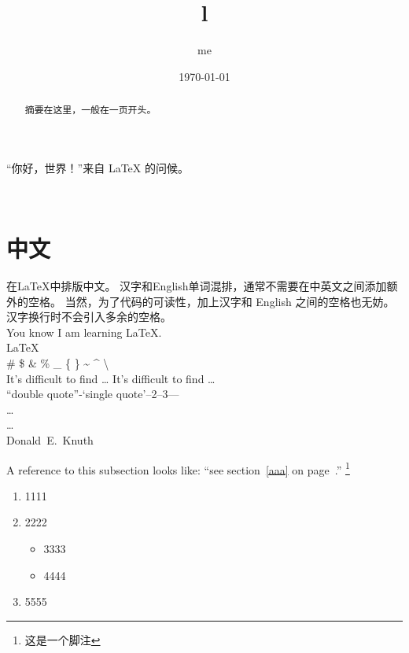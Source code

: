 \documentclass{ctexart}
\begin{document}
“你好，世界！”来自 \LaTeX{} 的问候。\\
\title{l}
\author{me}
\date{\today}
\maketitle
\begin{abstract}
    摘要在这里，一般在一页开头。

\end{abstract}
\tableofcontents 
 \\ \par

\section{中文}

在\LaTeX{}中排版中文。
汉字和English单词混排，通常不需要在中英文之间添加额外的空格。
当然，为了代码的可读性，加上汉字和 English 之间的空格也无妨。
汉字换行时不会引入多余的空格。\\
You know
I am learning \LaTeX{}.\\
\LaTeX{} \\
\# \$ \& \% \_ \{ \} \~{} \^{}  \textbackslash \\
It's difficult to find \ldots\newline
It's dif{}f{}icult to f{}ind \ldots \\
``double quote''-`single quote'--2--3---\\

\dots \\
\ldots \\
Donald~E.~Knuth  

 \par

A reference to this subsection
\label{aaa} looks like:
``see section~\ref{aaa} on
page~\pageref{aaa}.''
\footnote{这是一个脚注}


\renewcommand{\labelenumi}%
{\Alph{enumi}>}
\renewcommand{\labelitemi}{\ddag}
\begin{enumerate}
\item 1111
\item 2222
\begin{itemize}
    \item 3333
    \item 4444
\end{itemize}
\item 5555
\end{enumerate}
\end{document}
